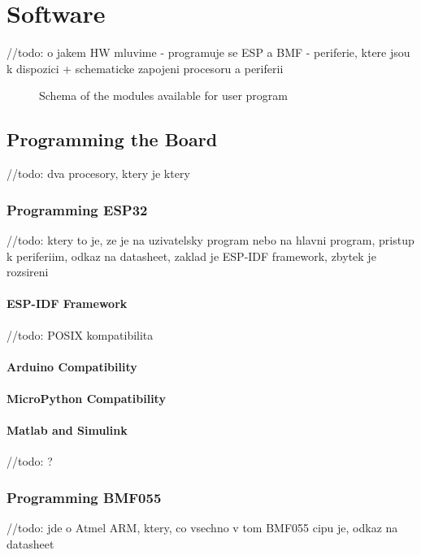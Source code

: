 \chapter{Software}

//todo: o jakem HW mluvime
- programuje se ESP a BMF
- periferie, ktere jsou k dispozici + schematicke zapojeni procesoru a periferii

\begin{figure}
	\centering
	\label{fig:SWmodules}
	\caption{Schema of the modules available for user program}
\end{figure}

\section{Programming the Board}
//todo: dva procesory, ktery je ktery

\subsection{Programming ESP32}
//todo: ktery to je, ze je na uzivatelsky program nebo na hlavni program, pristup k periferiim, odkaz na datasheet, zaklad je ESP-IDF framework, zbytek je rozsireni

\subsubsection{ESP-IDF Framework}
//todo: POSIX kompatibilita

\subsubsection{Arduino Compatibility}

\subsubsection{MicroPython Compatibility}

\subsubsection{Matlab and Simulink}
//todo: ?

\subsection{Programming BMF055}
//todo: jde o Atmel ARM, ktery, co vsechno v tom BMF055 cipu je, odkaz na datasheet

